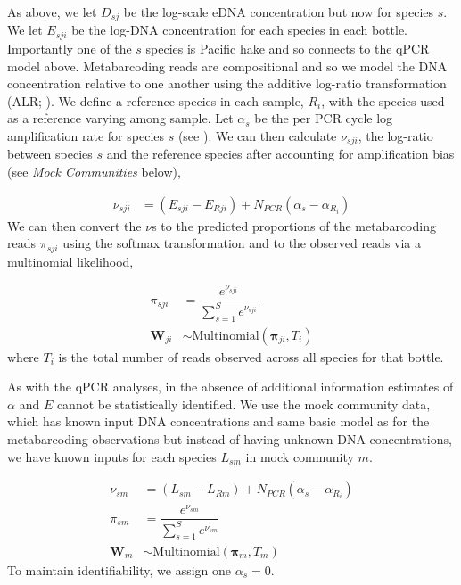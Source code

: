\documentclass{article}
\begin{document}
As above, we let $D_{sj}$ be the log-scale eDNA concentration but now for species $s$. We let $E_{sji}$ be the log-DNA concentration for each species in each bottle. Importantly one of the $s$ species is Pacific hake and so connects to the qPCR model above. Metabarcoding reads are compositional and so we model the DNA concentration relative to one another using the additive log-ratio transformation (ALR; \cite{aitchison1986}).  We define a reference species in each sample, $R_i$, with the species used as a reference varying among sample. Let $\alpha_s$ be the per PCR cycle log amplification rate for species $s$ (see \cite{shelton2023}).  We can then calculate $\nu_{sji}$, the log-ratio between species $s$ and the reference species after accounting for amplification bias (see \textit{Mock Communities} below),

\begin{align} 
  \nu_{sji} &= \left( E_{sji} - E_{Rji}\right) + N_{PCR} \left(\alpha_s - \alpha_{R_i} \right) 
\end{align}
We can then convert the $\nu$s to the predicted proportions of the metabarcoding reads $\pi_{sji}$ using the softmax transformation and to the observed reads via a multinomial likelihood,

\begin{align} 
  \pi_{sji} &= \dfrac{e^{\nu_{sji}}}{\sum_{s=1}^S e^{\nu_{sji}}} \\
  \boldsymbol{W}_{ji} & \sim  \mathrm{Multinomial}\left(\boldsymbol{\pi}_{ji},T_{i}\right) 
\end{align}
where $T_{i}$ is the total number of reads observed across all species for that bottle. 

As with the qPCR analyses, in the absence of additional information estimates of $\alpha$ and $E$ cannot be statistically identified.  We use the mock community data, which has known input DNA concentrations and  same basic model as for the metabarcoding observations but instead of having unknown DNA concentrations, we have known inputs for each species $L_{sm}$ in mock community $m$. 

\begin{align} 
 \nu_{sm} &= \left( L_{sm} - L_{Rm}\right) + N_{PCR} \left(\alpha_s - \alpha_{R_i} \right) \\
  \pi_{sm} &= \dfrac{e^{\nu_{sm}}}{\sum_{s=1}^S e^{\nu_{sm}}} \\
  \boldsymbol{W}_{m} & \sim  \mathrm{Multinomial}\left(\boldsymbol{\pi}_{m},T_{m}\right) 
\end{align}
To maintain identifiability, we assign one $\alpha_s = 0$.
\end{document}
